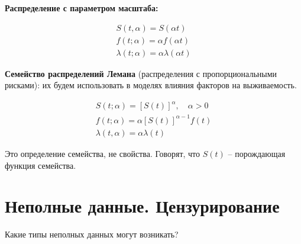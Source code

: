 \documentclass[main.tex]{subfiles}
\begin{document}
\textbf{Распределение с параметром масштаба:}

\begin{gather*}
	S(t, \alpha) = S(\alpha t) \\
	f(t; \alpha) = \alpha f(\alpha t) \\
	\lambda (t; \alpha) = \alpha \lambda (\alpha t)
\end{gather*}

\textbf{ Семейство распределений Лемана } (распределения с пропорциональными рисками): их будем использовать в моделях влияния факторов на выживаемость.

\begin{gather*}
	S(t; \alpha) = [S(t)]^\alpha, \quad \alpha > 0 \\
	f(t; \alpha) = \alpha [S(t)]^{\alpha - 1} f(t) \\
	\lambda (t, \alpha) = \alpha \lambda (t)
\end{gather*}

Это определение семейства, не свойства.
Говорят, что $ S(t) $ -- порождающая функция семейства.

\section{Неполные данные. Цензурирование}

Какие типы неполных данных могут возникать?
\end{document}
